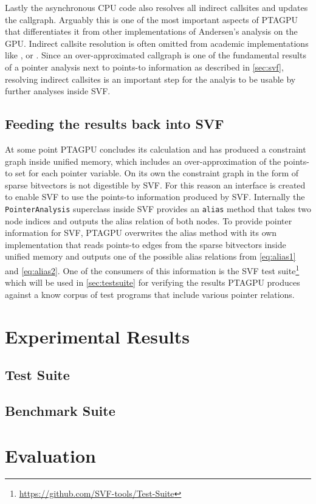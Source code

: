 Lastly the asynchronous CPU code also resolves all indirect callsites and updates the callgraph. 
Arguably this is one of the most important aspects of PTAGPU that differentiates it from other implementations of Andersen's analysis on the GPU.
Indirect callsite resolution is often omitted from academic implementations like \cite{mendez2012gpu}, \cite{zuo2021systemizing} or \cite{su2014parallel}.
Since an over-approximated callgraph is one of the fundamental results of a pointer analysis next to points-to information as described in \autoref{sec:svf}, resolving indirect callsites is an important step for the analyis to be usable by further analyses inside SVF.
\subsection{Feeding the results back into SVF}
At some point PTAGPU concludes its calculation and has produced a constraint graph inside unified memory, which includes an over-approximation of the points-to set for each pointer variable.
On its own the constraint graph in the form of sparse bitvectors is not digestible by SVF. For this reason an interface is created to enable SVF to use the points-to information produced by SVF.
Internally the \verb|PointerAnalysis| superclass inside SVF provides an \verb|alias| method that takes two node indices and outputs the alias relation of both nodes.
To provide pointer information for SVF, PTAGPU overwrites the alias method with its own implementation that reads points-to edges from the sparse bitvectors inside unified memory and outputs one of the possible alias relations from \autoref{eq:alias1} and \autoref{eq:alias2}.
One of the consumers of this information is the SVF test suite\footnote{\url{https://github.com/SVF-tools/Test-Suite}} which will be used in \autoref{sec:testsuite} for verifying the results PTAGPU produces against a know corpus of test programs that include various pointer relations.
\section{Experimental Results}
\subsection{Test Suite}
\subsection{Benchmark Suite}
\section{Evaluation}

